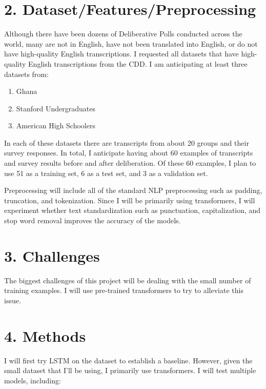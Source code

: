 \documentclass[12pt,]{article}
\providecommand{\tightlist}{%
\setlength{\itemsep}{0pt}\setlength{\parskip}{0pt}}
\begin{document}
\hypertarget{datasetfeaturespreprocessing}{%
\section{2.
Dataset/Features/Preprocessing}\label{datasetfeaturespreprocessing}}

Although there have been dozens of Deliberative Polls conducted across
the world, many are not in English, have not been translated into
English, or do not have high-quality English transcriptions. I requested
all datasets that have high-quality English transcriptions from the CDD.
I am anticipating at least three datasets from:

\begin{enumerate}
\def\labelenumi{\arabic{enumi}.}
\tightlist
\item
  Ghana
\item
  Stanford Undergraduates
\item
  American High Schoolers
\end{enumerate}

In each of these datasets there are transcripts from about 20 groups and
their survey responses. In total, I anticipate having about 60 examples
of transcripts and survey results before and after deliberation. Of
these 60 examples, I plan to use 51 as a training set, 6 as a test set,
and 3 as a validation set.

Preprocessing will include all of the standard NLP preprocessing such as
padding, truncation, and tokenization. Since I will be primarily using
transformers, I will experiment whether text standardization such as
punctuation, capitalization, and stop word removal improves the accuracy
of the models.

\hypertarget{challenges}{%
\section{3. Challenges}\label{challenges}}

The biggest challenges of this project will be dealing with the small
number of training examples. I will use pre-trained transformers to try
to alleviate this issue.

\hypertarget{methods}{%
\section{4. Methods}\label{methods}}

I will first try LSTM on the dataset to establish a baseline. However,
given the small dataset that I'll be using, I primarily use
transformers. I will test multiple models, including:
\end{document}
